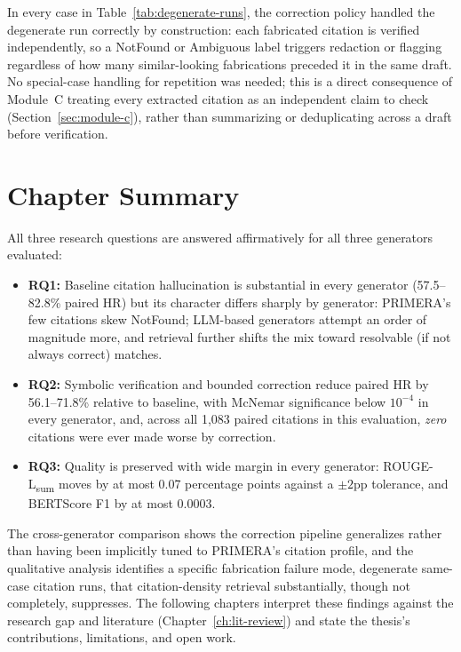 In every case in Table~\ref{tab:degenerate-runs}, the correction policy handled the degenerate run correctly by construction: each fabricated citation is verified independently, so a NotFound or Ambiguous label triggers redaction or flagging regardless of how many similar-looking fabrications preceded it in the same draft. No special-case handling for repetition was needed; this is a direct consequence of Module~C treating every extracted citation as an independent claim to check (Section~\ref{sec:module-c}), rather than summarizing or deduplicating across a draft before verification.

\section{Chapter Summary}
\label{sec:results-summary}

All three research questions are answered affirmatively for all three generators evaluated:

\begin{itemize}
  \item \textbf{RQ1:} Baseline citation hallucination is substantial in every generator (57.5--82.8\% paired HR) but its character differs sharply by generator: PRIMERA's few citations skew NotFound; LLM-based generators attempt an order of magnitude more, and retrieval further shifts the mix toward resolvable (if not always correct) matches.
  \item \textbf{RQ2:} Symbolic verification and bounded correction reduce paired HR by 56.1--71.8\% relative to baseline, with McNemar significance below $10^{-4}$ in every generator, and, across all 1{,}083 paired citations in this evaluation, \emph{zero} citations were ever made worse by correction.
  \item \textbf{RQ3:} Quality is preserved with wide margin in every generator: ROUGE-L\textsubscript{sum} moves by at most 0.07 percentage points against a $\pm2$pp tolerance, and BERTScore F1 by at most 0.0003.
\end{itemize}

The cross-generator comparison shows the correction pipeline generalizes rather than having been implicitly tuned to PRIMERA's citation profile, and the qualitative analysis identifies a specific fabrication failure mode, degenerate same-case citation runs, that citation-density retrieval substantially, though not completely, suppresses. The following chapters interpret these findings against the research gap and literature (Chapter~\ref{ch:lit-review}) and state the thesis's contributions, limitations, and open work.
